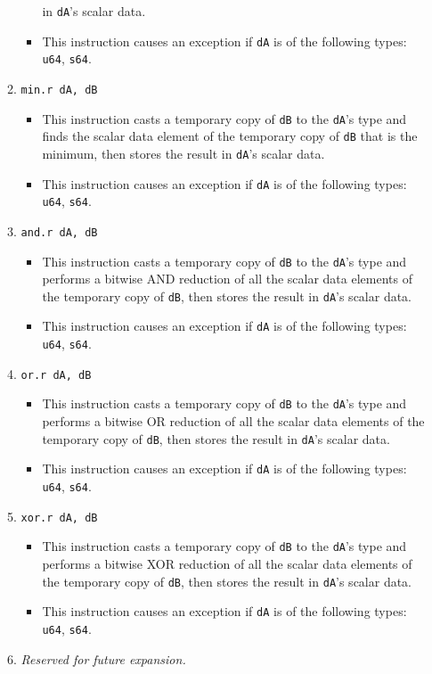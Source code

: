 \documentclass{article}
\begin{document}
\begin{itemize}
\begin{enumerate}
\begin{itemize}
					in \texttt{dA}'s scalar data.
				\item This instruction causes an exception if \texttt{dA}
					is of the following types: \texttt{u64}, \texttt{s64}.
				\end{itemize}
			\item \texttt{min.r dA, dB}
				\begin{itemize}
				\item This instruction casts a temporary copy of
					\texttt{dB} to the \texttt{dA}'s type and finds the
					scalar data element of the temporary copy of
					\texttt{dB} that is the minimum, then stores the result
					in \texttt{dA}'s scalar data.
				\item This instruction causes an exception if \texttt{dA}
					is of the following types: \texttt{u64}, \texttt{s64}.
				\end{itemize}

			\item \texttt{and.r dA, dB}
				\begin{itemize}
				\item This instruction casts a temporary copy of
					\texttt{dB} to the \texttt{dA}'s type and performs a
					bitwise AND reduction of all the scalar data elements
					of the temporary copy of \texttt{dB}, then stores the
					result in \texttt{dA}'s scalar data.
				\item This instruction causes an exception if \texttt{dA}
					is of the following types: \texttt{u64}, \texttt{s64}.
				\end{itemize}
			\item \texttt{or.r dA, dB}
				\begin{itemize}
				\item This instruction casts a temporary copy of
					\texttt{dB} to the \texttt{dA}'s type and performs a
					bitwise OR reduction of all the scalar data elements of
					the temporary copy of \texttt{dB}, then stores the
					result in \texttt{dA}'s scalar data.
				\item This instruction causes an exception if \texttt{dA}
					is of the following types: \texttt{u64}, \texttt{s64}.
				\end{itemize}
			\item \texttt{xor.r dA, dB}
				\begin{itemize}
				\item This instruction casts a temporary copy of
					\texttt{dB} to the \texttt{dA}'s type and performs a
					bitwise XOR reduction of all the scalar data elements
					of the temporary copy of \texttt{dB}, then stores the
					result in \texttt{dA}'s scalar data.
				\item This instruction causes an exception if \texttt{dA}
					is of the following types: \texttt{u64}, \texttt{s64}.
				\end{itemize}
			\item \textit{Reserved for future expansion.}


\end{enumerate}
\end{itemize}
\end{document}
